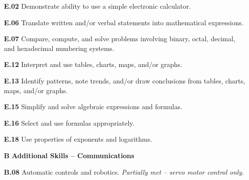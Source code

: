 \item{\bf E.02} Demonstrate ability to use a simple electronic calculator.
\item{\bf E.06} Translate written and/or verbal statements into mathematical expressions.
\item{\bf E.07} Compare, compute, and solve problems involving binary, octal, decimal, and hexadecimal numbering systems.
\item{\bf E.12} Interpret and use tables, charts, maps, and/or graphs.
\item{\bf E.13} Identify patterns, note trends, and/or draw conclusions from tables, charts, maps, and/or graphs.
\item{\bf E.15} Simplify and solve algebraic expressions and formulas.
\item{\bf E.16} Select and use formulas appropriately.
\item{\bf E.18} Use properties of exponents and logarithms.
\medskip

\vskip 5pt

\medskip
\item{\bf B} {\bf Additional Skills -- Communications}
\item{\bf B.08} Automatic controls and robotics.  {\it Partially met -- servo motor control only.}
\medskip

